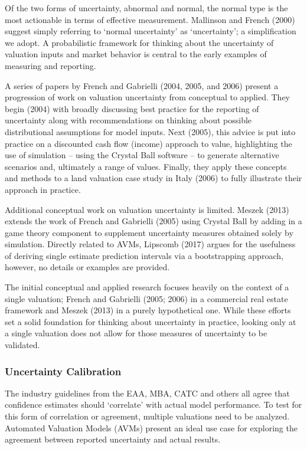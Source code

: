 \documentclass[colTwo]{anon}
\theoremstyle{definition}
\begin{document}
Of the two forms of uncertainty, abnormal and normal, the normal type is the most actionable in terms of effective measurement.  Mallinson and French (2000) suggest simply referring to ‘normal uncertainty’ as ‘uncertainty’; a simplification we adopt.  A probabilistic framework for thinking about the uncertainty of valuation inputs and market behavior is central to the early examples of measuring and reporting.  

A series of papers by French and Gabrielli (2004, 2005, and 2006) present a progression of work on valuation uncertainty from conceptual to applied. They begin (2004) with broadly discussing best practice for the reporting of uncertainty along with recommendations on thinking about possible distributional assumptions for model inputs. Next (2005), this advice is put into practice on a discounted cash flow (income) approach to value, highlighting the use of simulation -- using the Crystal Ball software -- to generate alternative scenarios and, ultimately a range of values.  Finally, they apply these concepts and methods to a land valuation case study in Italy (2006) to fully illustrate their approach in practice. 

Additional conceptual work on valuation uncertainty is limited.  Meszek (2013) extends the work of French and Gabrielli (2005) using Crystal Ball by adding in a game theory component to supplement uncertainty measures obtained solely by simulation.  Directly related to AVMs, Lipscomb (2017) argues for the usefulness of deriving single estimate prediction intervals via a bootstrapping approach, however, no details or examples are provided. 

The initial conceptual and applied research focuses heavily on the context of a single valuation; French and Gabrielli (2005; 2006) in a commercial real estate framework and Meszek (2013) in a purely hypothetical one. While these efforts set a solid foundation for thinking about uncertainty in practice, looking only at a single valuation does not allow for those measures of uncertainty to be validated. 

\subsubsection{Uncertainty Calibration}

The industry guidelines from the EAA, MBA, CATC and others all agree that confidence estimates should ‘correlate’ with actual model performance.  To test for this form of correlation or agreement, multiple valuations need to be analyzed.  Automated Valuation Models (AVMs) present an ideal use case for exploring the agreement between reported uncertainty and actual results.  
\end{document}
